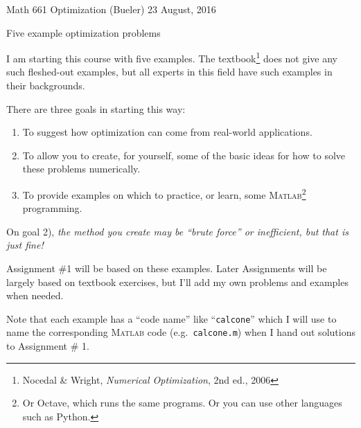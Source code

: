 \documentclass[12pt]{amsart}
\newcommand{\Matlab}{\textsc{Matlab}\xspace}
\begin{document}
\scriptsize \noindent Math 661 Optimization (Bueler) \hfill 23 August, 2016
\normalsize

\medskip\bigskip
\Large
\centerline{Five example optimization problems}

\bigskip\medskip
\normalsize

\thispagestyle{empty}

I am starting this course with five examples.  The textbook\footnote{Nocedal \& Wright, \emph{Numerical Optimization}, 2nd ed., 2006} does not give any such fleshed-out examples, but all experts in this field have such examples in their backgrounds.

There are three goals in starting this way:
\renewcommand{\labelenumi}{\arabic{enumi})}
\begin{enumerate}
\item To suggest how optimization can come from real-world applications.
\item To allow you to create, for yourself, some of the basic ideas for how to solve these problems numerically.
\item To provide examples on which to practice, or learn, some \Matlab\footnote{Or Octave, which runs the same programs.  Or you can use other languages such as Python.} programming.
\end{enumerate}
On goal 2), \emph{the method you create may be ``brute force'' or inefficient, but that is just fine!}

Assignment \#1 will be based on these examples.  Later Assignments will be largely based on textbook exercises, but I'll add my own problems and examples when needed.

Note that each example has a ``code name'' like ``\texttt{calcone}'' which I will use to name the corresponding \Matlab code (e.g.~\texttt{calcone.m}) when I hand out solutions to Assignment \# 1.
\end{document}
